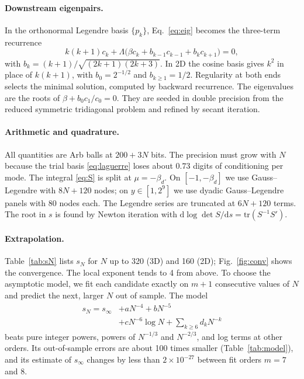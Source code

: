 \documentclass[aps,prd,twocolumn,superscriptaddress,nofootinbib,floatfix]{revtex4-2}
\newcommand{\sinf}{s_\infty}
\newcommand{\bd}{\beta_d}
\newcommand{\dd}{\mathrm{d}}
\begin{document}
\paragraph{Downstream eigenpairs.}
In the orthonormal Legendre basis $\{p_k\}$, Eq.~\eqref{eq:eig} becomes the three-term recurrence
\begin{equation}
k(k+1)c_k+\Lambda\bigl(\beta c_k+b_{k-1}c_{k-1}+b_kc_{k+1}\bigr)=0,
\end{equation}
with $b_k=(k+1)/\sqrt{(2k+1)(2k+3)}$.
In 2D the cosine basis gives $k^2$ in place of $k(k+1)$, with $b_0=2^{-1/2}$ and $b_{k\ge1}=1/2$. Regularity at
both ends selects the minimal solution, computed by backward recurrence. The eigenvalues are the roots of
$\beta+b_0c_1/c_0=0$. They are seeded in double precision from the reduced symmetric tridiagonal problem and
refined by secant iteration.

\paragraph{Arithmetic and quadrature.}
All quantities are Arb balls \cite{Johansson2017} at $200+3N$ bits. The precision must grow with $N$ because the
trial basis \eqref{eq:laguerre} loses about $0.73$ digits of conditioning per mode. The integral \eqref{eq:S} is
split at $\mu=-\bd$. On $[-1,-\bd]$ we use Gauss--Legendre with $8N+120$ nodes; on $y\in[1,2^9]$ we use dyadic
Gauss--Legendre panels with 80 nodes each. The Legendre series are truncated at $6N+120$ terms. The root in $s$
is found by Newton iteration with $\dd\log\det S/\dd s=\mathrm{tr}(S^{-1}S')$.

\paragraph{Extrapolation.}
Table~\ref{tab:sN} lists $s_N$ for $N$ up to 320 (3D) and 160 (2D); Fig.~\ref{fig:conv} shows the convergence.
The local exponent tends to 4 from above. To choose the asymptotic model, we fit each candidate exactly on $m+1$
consecutive values of $N$ and predict the next, larger $N$ out of sample. The model
\begin{align}
s_N=\sinf&+aN^{-4}+bN^{-5}\nonumber\\
&+cN^{-6}\log N+\textstyle\sum_{k\ge6}d_kN^{-k}
\label{eq:model}
\end{align}
beats pure integer powers, powers of $N^{-1/3}$ and $N^{-2/3}$, and log terms at other orders. Its
out-of-sample errors are about 100 times smaller (Table~\ref{tab:model}), and its estimate of $\sinf$ changes
by less than $2\times10^{-27}$ between fit orders $m=7$ and $8$.
\end{document}

